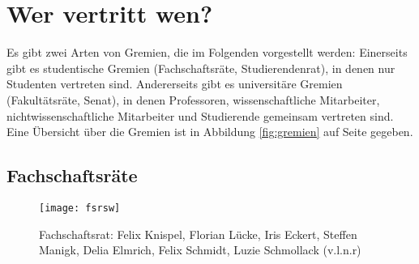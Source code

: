 
\section{Wer vertritt wen?}
\label{vertretung}

Es gibt zwei Arten von Gremien, die im Folgenden vorgestellt werden: Einerseits gibt es studentische Gremien (Fachschaftsräte, Studierendenrat), in denen nur Studenten vertreten sind. Andererseits gibt es universitäre Gremien (Fakultätsräte, Senat), in denen Professoren, wissenschaftliche Mitarbeiter, nichtwissenschaftliche Mitarbeiter und Studierende gemeinsam vertreten sind.
Eine Übersicht über die Gremien ist in Abbildung \ref{fig:gremien} auf Seite \pageref{fig:gremien} gegeben.

\subsection{Fachschaftsräte}

\begin{figure}[!t]
    \centering
    \texttt{[image: fsrsw]}
    \caption{Fachschaftsrat: Felix Knispel, Florian Lücke, Iris Eckert, Steffen Manigk, Delia Elmrich, Felix Schmidt, Luzie Schmollack \newline (v.l.n.r)}
             \label{fig:fsr}
\end{figure}

